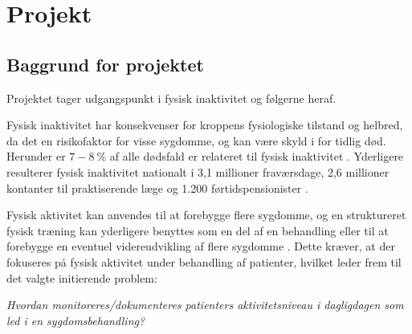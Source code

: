 \chapter{Projekt}
\section{Baggrund for projektet}
Projektet tager udgangspunkt i fysisk inaktivitet og følgerne heraf. 

Fysisk inaktivitet har konsekvenser for kroppens fysiologiske tilstand og helbred, da det en risikofaktor for visse sygdomme, og kan være skyld i for tidlig død. Herunder er $7-8~\%$ af alle dødsfald er relateret til fysisk inaktivitet \citep{aagaard2014,motionsraad2007}.  
Yderligere resulterer fysisk inaktivitet nationalt i 3,1 millioner fraværsdage, 2,6 millioner kontanter til praktiserende læge og 1.200 førtidspensionister \citep{christensen2012}. 

Fysisk aktivitet kan anvendes til at forebygge flere sygdomme, og en struktureret fysisk træning kan yderligere benyttes som en del af en behandling eller til at forebygge en eventuel videreudvikling af flere sygdomme \citep{motionsraad2007}. Dette kræver, at der fokuseres på fysisk aktivitet under behandling af patienter, hvilket leder frem til det valgte initierende problem:

\noindent
\begin{center}
\textit{Hvordan monitoreres/dokumenteres patienters aktivitetsniveau i dagligdagen som led i en sygdomsbehandling?}  
\end{center}
